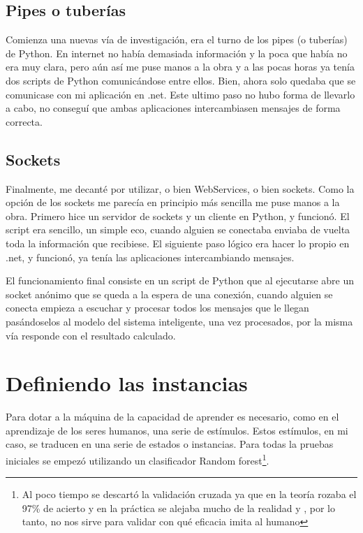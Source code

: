 \subsection{Pipes o tuberías}
Comienza una nuevas vía de investigación, era el turno de los pipes (o tuberías) de Python. En internet no había demasiada información y la poca que había no era muy clara, pero aún así me puse manos a la obra y a las pocas horas ya tenía dos scripts de Python comunicándose entre ellos. Bien, ahora solo quedaba que se comunicase con mi aplicación en .net. Este ultimo paso no hubo forma de llevarlo a cabo, no conseguí que ambas aplicaciones intercambiasen mensajes de forma correcta.

\subsection{Sockets}
Finalmente, me decanté por utilizar, o bien WebServices, o bien sockets. Como la opción de los sockets me parecía en principio más sencilla me puse manos a la obra. Primero hice un servidor de sockets y un cliente en Python, y funcionó. El script era sencillo, un simple eco, cuando alguien se conectaba enviaba de vuelta toda la información que recibiese. El siguiente paso lógico era hacer lo propio en .net, y funcionó, ya tenía las aplicaciones intercambiando mensajes.

El funcionamiento final consiste en un script de Python que al ejecutarse abre un socket anónimo que se queda a la espera de una conexión, cuando alguien se conecta empieza a escuchar y procesar todos los mensajes que le llegan pasándoselos al modelo del sistema inteligente, una vez procesados, por la misma vía responde con el resultado calculado.


\section{Definiendo las instancias}\label{sec:instancias}

Para dotar a la máquina de la capacidad de aprender es necesario, como en el aprendizaje de los seres humanos, una serie de estímulos. Estos estímulos, en mi caso, se traducen en una serie de estados o instancias. Para todas la pruebas iniciales se empezó utilizando un clasificador Random forest\footnote{Al poco tiempo se descartó la validación cruzada ya que en la teoría rozaba el 97\% de acierto y en la práctica se alejaba mucho de la realidad y , por lo tanto, no nos sirve para validar con qué eficacia imita al humano}.

